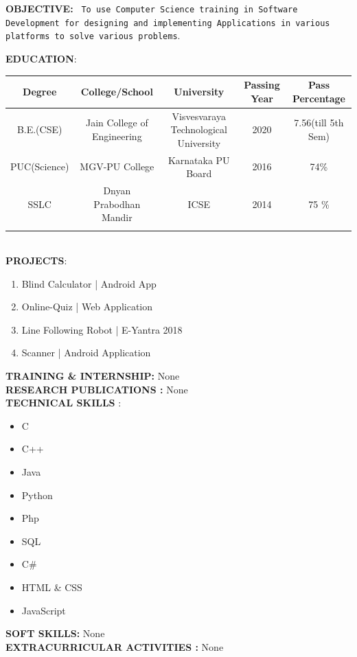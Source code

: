 \documentclass{article}
\begin{document}
		
\large \textbf{OBJECTIVE:}
	\texttt{	
	To use Computer Science training in Software Development for designing and implementing Applications in various platforms to solve various problems}.
\vspace{\baselineskip}
	
	\large \textbf{EDUCATION}:
	
	\begin{tabular}{|c|c|c|c|c|}
	\small Degree & \small College/School & \small University & \small Passing Year & \small Pass Percentage \\
		\hline
		\footnotesize  B.E.(CSE)  & \footnotesize Jain College of Engineering & \footnotesize Visvesvaraya Technological University & \footnotesize 2020 & \footnotesize 7.56(till 5th Sem) \\
		\footnotesize PUC(Science) & \footnotesize MGV-PU College & \footnotesize Karnataka PU Board & \footnotesize 2016 &\footnotesize 74\%  \\
		\footnotesize SSLC & \footnotesize Dnyan Prabodhan Mandir & \footnotesize ICSE & \footnotesize 2014 & \footnotesize 75 \%  \\

\vspace{\baselineskip}
	\end{tabular}
\\
	\large \textbf{PROJECTS}:
	\begin{enumerate}
		\item Blind Calculator | Android App
		\item Online-Quiz | Web Application
		\item Line Following Robot | E-Yantra 2018
		\item Scanner | Android Application
		
		\vspace{\baselineskip}
	\end{enumerate}
	\large \textbf{TRAINING \&
		INTERNSHIP:}	
	None
	\\
	\large \textbf{RESEARCH PUBLICATIONS :}	
	None
	\\
	\large \textbf{TECHNICAL SKILLS
}:
	\begin{itemize}
		\item C
		\item C++
		\item Java
		\item Python
		\item Php
		\item SQL
		\item C\#
		\item HTML \& CSS
		\item JavaScript
	\end{itemize}
\large \textbf{SOFT SKILLS:}	
None
\\
\large \textbf{EXTRACURRICULAR ACTIVITIES
:}	
None
\\
	
\end{document}
